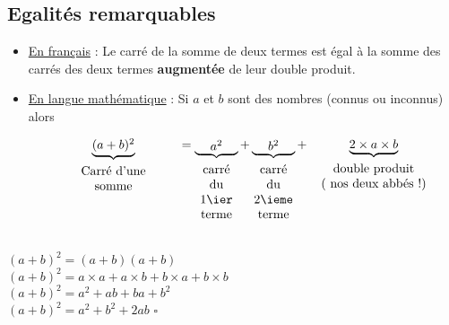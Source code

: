 \subsection{Egalités remarquables}
\begin{propriete}
    \begin{itemize}
    \item \underline{En français} : 
    \og{}Le carré de la somme de deux termes est égal à la somme des carrés des deux termes {\bfseries augmentée} de leur double produit.\fg{}

    \bigskip
    \item \underline{En \og{}langue\fg{} mathématique} :
    Si $a$ et $b$ sont des nombres (connus ou inconnus) alors 
    
    $$\underbrace{\parbox{0.1\linewidth}{\centering $(a+b)^2$}}_{\parbox{0.3\linewidth}{\centering\vspace*{1mm}Carré d'une\\somme}}
    =\underbrace{\parbox{0.1\linewidth}{\centering $a^2$}}_{\parbox{0.1\linewidth}{\centering\vspace*{1mm}carré du\\1\ier terme}}
    +\underbrace{\parbox{0.1\linewidth}{\centering $b^2$}}_{\parbox{0.1\linewidth}{\centering\vspace*{1mm}carré du\\2\ieme terme}}
    +\underbrace{\centering 2\times a\times b}_{\parbox{0.3\linewidth}{\centering\vspace*{1mm}double produit\\( nos deux abbés !)}}$$    
    \end{itemize}
\end{propriete}

\begin{preuve}
    \phantom{rrr}\\
    $(a+b)^2=(a+b)(a+b)$\\
    $(a+b)^2=a\times a+a\times b+b\times a+b\times b$\\
    $(a+b)^2=a^2+ab+ba+b^2$\\
    $(a+b)^2=a^2+b^2+2ab$ $\square$
\end{preuve}


